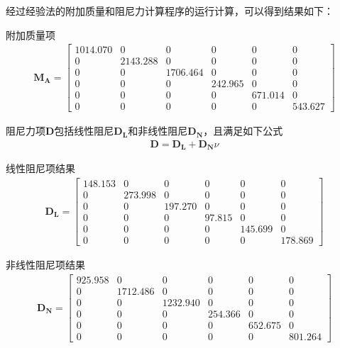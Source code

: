 经过经验法的附加质量和阻尼力计算程序的运行计算，可以得到结果如下：

附加质量项
\begin{equation}
\begin{aligned}
\bm{M_{A}} = \begin{bmatrix}
   1014.070&0   &0   &0&0&0 \\
     0 &2143.288&0   &0&0&0 \\
     0 &0   &1706.464&0&0&0 \\
     0 &0   &0   &242.965 &0 &0\\
     0 &0   &0   &0 & 671.014 &0 \\
     0 &0   &0   &0 &0   &543.627
         \end{bmatrix}
\end{aligned}
\end{equation}

阻尼力项$\bm{D}$包括线性阻尼$\bm{D_L}$和非线性阻尼$\bm{D_N}$，且满足如下公式
\begin{equation}
\begin{aligned}
\bm{D} = \bm{D_L} + \bm{D_N}\nu
\end{aligned}
\end{equation}

线性阻尼项结果
\begin{equation}
\begin{aligned}
\bm{D_L} = \begin{bmatrix}
   148.153&0   &0   &0&0&0 \\
     0 &273.998&0   &0&0&0 \\
     0 &0   &197.270&0&0&0 \\
     0 &0   &0   &97.815 &0 &0\\
     0 &0   &0   &0 & 145.699 &0 \\
     0 &0   &0   &0 &0   &178.869
         \end{bmatrix}
\end{aligned}
\end{equation}

非线性阻尼项结果
\begin{equation}
\begin{aligned}
\bm{D_N} = \begin{bmatrix}
   925.958&0   &0   &0&0&0 \\
     0 &1712.486&0   &0&0&0 \\
     0 &0   &1232.940&0&0&0 \\
     0 &0   &0   &254.366 &0 &0\\
     0 &0   &0   &0 & 652.675 &0 \\
     0 &0   &0   &0 &0   &801.264
         \end{bmatrix}
\end{aligned}
\end{equation}

